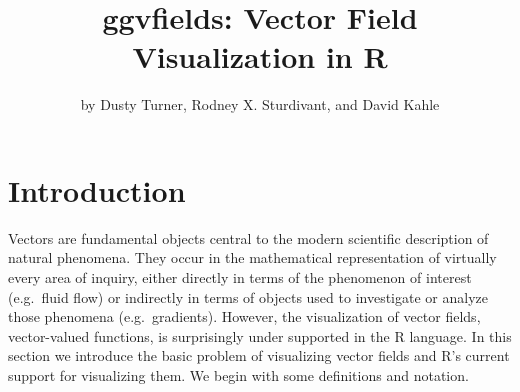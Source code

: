 \title{ggvfields: Vector Field Visualization in R}


\author{by Dusty Turner, Rodney X. Sturdivant, and David Kahle}

\maketitle


\section{Introduction}\label{introduction}

Vectors are fundamental objects central to the modern scientific description of natural phenomena. They occur in the mathematical representation of virtually every area of inquiry, either directly in terms of the phenomenon of interest (e.g.~fluid flow) or indirectly in terms of objects used to investigate or analyze those phenomena (e.g.~gradients). However, the visualization of vector fields, vector-valued functions, is surprisingly under supported in the R language. In this section we introduce the basic problem of visualizing vector fields and R's current support for visualizing them. We begin with some definitions and notation.

